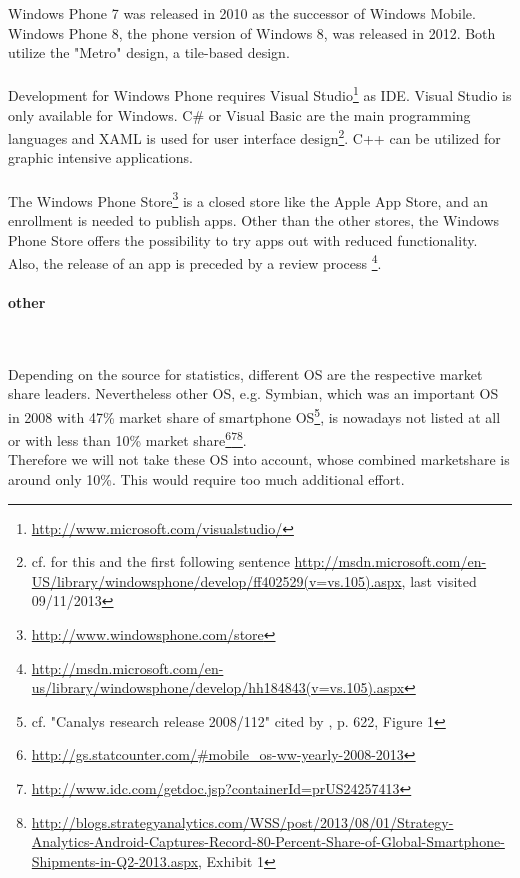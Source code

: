 \vspace{0.75em}
Windows Phone 7 was released in 2010 as the successor of Windows Mobile. Windows Phone 8, the phone version of Windows 8, was released in 2012. Both utilize the "Metro" design, a tile-based design.
\\
\\
Development for Windows Phone requires Visual Studio\footnote{\url{http://www.microsoft.com/visualstudio/}} as IDE. Visual Studio is only available for Windows. C\# or Visual Basic are the main programming languages and XAML is used for user interface design\footnote{cf. for this and the first following sentence \url{http://msdn.microsoft.com/en-US/library/windowsphone/develop/ff402529(v=vs.105).aspx}, last visited 09/11/2013}. C++ can be utilized for graphic intensive applications.
\\
\\
The Windows Phone Store\footnote{\url{http://www.windowsphone.com/store}} is a closed store like the Apple App Store, and an enrollment is needed to publish apps. Other than the other stores, the Windows Phone Store offers the possibility to try apps out with reduced functionality. Also, the release of an app is preceded by a review process \footnote{\url{http://msdn.microsoft.com/en-us/library/windowsphone/develop/hh184843(v=vs.105).aspx}}.

\paragraph{other}$\;$

\vspace{0.75em}
Depending on the source for statistics, different OS are the respective market share leaders. Nevertheless other OS, e.g. Symbian, which was an important OS in 2008 with 47\% market share of smartphone OS\footnote{cf. "Canalys research release 2008/112" cited by \cite{Lin.2009}, p. 622, Figure 1}, is nowadays not listed at all or with less than 10\% market share\footnote{\url{http://gs.statcounter.com/\#mobile_os-ww-yearly-2008-2013}}\footnote{\url{http://www.idc.com/getdoc.jsp?containerId=prUS24257413}}\footnote{\url{http://blogs.strategyanalytics.com/WSS/post/2013/08/01/Strategy-Analytics-Android-Captures-Record-80-Percent-Share-of-Global-Smartphone-Shipments-in-Q2-2013.aspx}, Exhibit 1}.
\\
Therefore we will not take these OS into account, whose combined marketshare is around only 10\%. This would require too much additional effort.

